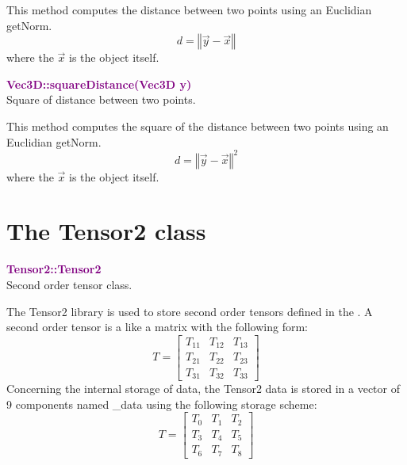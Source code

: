 This method computes the distance between two points using an Euclidian getNorm.
\begin{equation*}
d = \left\Vert \overrightarrow{y} - \overrightarrow{x} \right\Vert 
\end{equation*}
where the $\overrightarrow{x}$ is the object itself.

\textcolor{purple}{\textbf{Vec3D::squareDistance(Vec3D y)}}\label{Vec3D::squareDistance(Vec3D y)}\\
Square of distance between two points.

This method computes the square of the distance between two points using an Euclidian getNorm.
\begin{equation*}
d = {\left\Vert \overrightarrow{y} - \overrightarrow{x} \right\Vert}^2 
\end{equation*}
where the $\overrightarrow{x}$ is the object itself.

\section{The Tensor2 class}

\textcolor{purple}{\textbf{Tensor2::Tensor2}}\label{Tensor2::Tensor2}\\
Second order tensor class.

The Tensor2 library is used to store second order tensors defined in the \DynELA. A second order tensor is a like a matrix with the following form:
\begin{equation*}
T=\left[\begin{array}{ccc}
  T_{11} & T_{12} & T_{13}\\
  T_{21} & T_{22} & T_{23}\\
  T_{31} & T_{32} & T_{33}
  \end{array}\right]
\end{equation*}
Concerning the internal storage of data, the Tensor2 data is stored in a vector of 9 components named \_data using the following storage scheme:
\begin{equation*}
T=\left[\begin{array}{ccc}
    T_{0} & T_{1} & T_{2}\\
    T_{3} & T_{4} & T_{5}\\
    T_{6} & T_{7} & T_{8}
    \end{array}\right]
\end{equation*}

